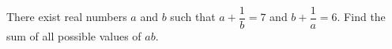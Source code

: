 There exist real numbers $a$ and $b$ such that $a+\dfrac{1}{b}=7$ and $b+\dfrac{1}{a}=6$. Find the sum of all possible values of $ab$.
